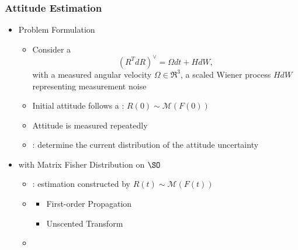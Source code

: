 \begin{frame}
\frametitle{Attitude Estimation}

\begin{itemize}
\item {} Problem Formulation
	\begin{itemize}
	\item Consider a 
	\[ (R^T dR)^\vee = \Omega dt + H dW,\]
	with a measured angular velocity $\Omega\in\Re^3$, a scaled Wiener process $HdW$ representing measurement noise
	\item Initial attitude follows a : $R(0)\sim\mathcal{M}(F(0))$
	\item Attitude is measured repeatedly
	\item {}: determine the current distribution of the attitude uncertainty
	\end{itemize}
\vspace*{0.3cm}\pause
\item {} with Matrix Fisher Distribution on $\SO$
	\begin{itemize}
	\item {}: estimation constructed by $R(t)\sim\mathcal{M}(F(t))$
	\item {}
		\begin{itemize}
		\item First-order Propagation
		\item Unscented Transform
		\end{itemize}
	\item {}
	\end{itemize}
\end{itemize}
\end{frame}

